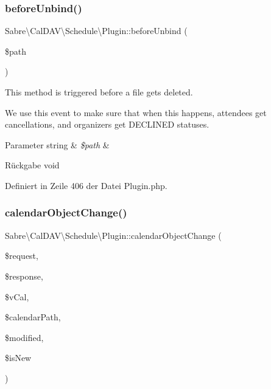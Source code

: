 \subsubsection{\texorpdfstring{before\+Unbind()}{beforeUnbind()}}
{\footnotesize\ttfamily Sabre\textbackslash{}\+Cal\+D\+A\+V\textbackslash{}\+Schedule\textbackslash{}\+Plugin\+::before\+Unbind (\begin{DoxyParamCaption}\item[{}]{\$path }\end{DoxyParamCaption})}

This method is triggered before a file gets deleted.

We use this event to make sure that when this happens, attendees get cancellations, and organizers get \textquotesingle{}D\+E\+C\+L\+I\+N\+ED\textquotesingle{} statuses.


\begin{DoxyParams}[1]{Parameter}
string & {\em \$path} & \\
\hline
\end{DoxyParams}
\begin{DoxyReturn}{Rückgabe}
void 
\end{DoxyReturn}


Definiert in Zeile 406 der Datei Plugin.\+php.

\mbox{\label{class_sabre_1_1_cal_d_a_v_1_1_schedule_1_1_plugin_a546feae19f0822e0f924db4c85a68e78}} 
\subsubsection{\texorpdfstring{calendar\+Object\+Change()}{calendarObjectChange()}}
{\footnotesize\ttfamily Sabre\textbackslash{}\+Cal\+D\+A\+V\textbackslash{}\+Schedule\textbackslash{}\+Plugin\+::calendar\+Object\+Change (\begin{DoxyParamCaption}\item[{\mbox{\hyperlink{interface_sabre_1_1_h_t_t_p_1_1_request_interface}{Request\+Interface}}}]{\$request,  }\item[{\mbox{\hyperlink{interface_sabre_1_1_h_t_t_p_1_1_response_interface}{Response\+Interface}}}]{\$response,  }\item[{\mbox{\hyperlink{class_sabre_1_1_v_object_1_1_component_1_1_v_calendar}{V\+Calendar}}}]{\$v\+Cal,  }\item[{}]{\$calendar\+Path,  }\item[{\&}]{\$modified,  }\item[{}]{\$is\+New }\end{DoxyParamCaption})}


